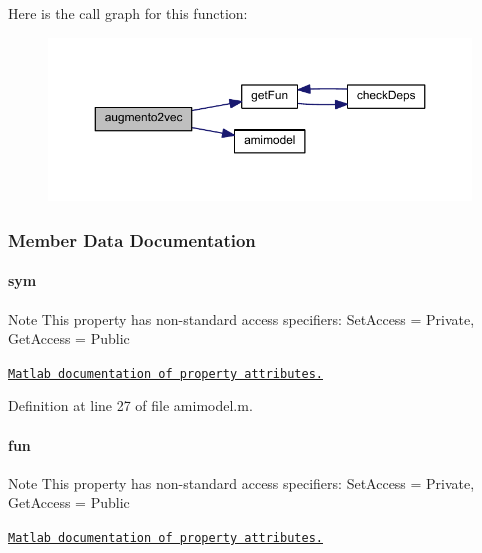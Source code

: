 Here is the call graph for this function\+:\nopagebreak
\begin{figure}[H]
\begin{center}
\leavevmode
\includegraphics[width=350pt]{classamimodel_aaed774df1b9efcebe493ae9f499bb8cf_cgraph}
\end{center}
\end{figure}




\subsubsection{Member Data Documentation}
\hypertarget{classamimodel_a3c48fff3d28406486a4f1b5e18da7ca6}{}
\paragraph[{sym}]{\setlength{\rightskip}{0pt plus 5cm}sym}\label{classamimodel_a3c48fff3d28406486a4f1b5e18da7ca6}
\begin{DoxyNote}{Note}
This property has non-\/standard access specifiers\+: {\ttfamily Set\+Access = Private, Get\+Access = Public} 

\href{http://www.mathworks.com/help/matlab/matlab_oop/property-attributes.html}{\tt Matlab documentation of property attributes.} 
\end{DoxyNote}


Definition at line 27 of file amimodel.\+m.

\hypertarget{classamimodel_a743fa290dbc0a67a3843d5ab0426e9b4}{}
\paragraph[{fun}]{\setlength{\rightskip}{0pt plus 5cm}fun}\label{classamimodel_a743fa290dbc0a67a3843d5ab0426e9b4}
\begin{DoxyNote}{Note}
This property has non-\/standard access specifiers\+: {\ttfamily Set\+Access = Private, Get\+Access = Public} 

\href{http://www.mathworks.com/help/matlab/matlab_oop/property-attributes.html}{\tt Matlab documentation of property attributes.} 
\end{DoxyNote}


